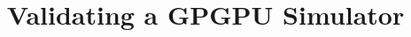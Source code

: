 \documentclass{sig-alternate}
\newcommand{\ignore}[1]{}
\begin{document}
\title{Validating a GPGPU Simulator}

\ignore{
\author{First Author\\
Institution1\\
Institution1 address\\
{\tt\small firstauthor@i1.org}
\and
Second Author\\
Institution2\\
First line of institution2 address\\
{\small\url{http://www.author.org/~second}}
}
}

\maketitle


\newcommand{\name}{$\alpha$-SJF}
\newcommand{\Name}{$\alpha$-SJF}




\singlespace 


\end{document}
